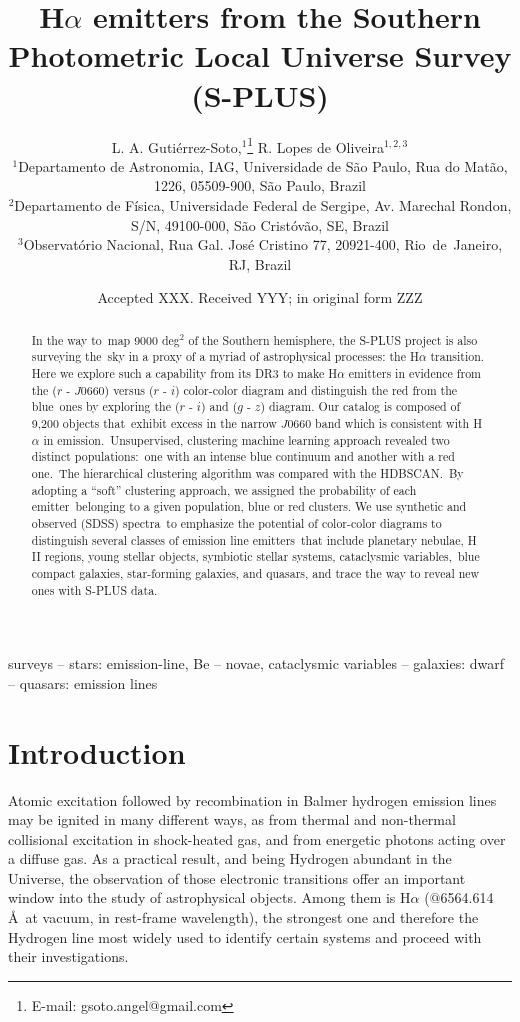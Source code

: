 \documentclass[fleqn,usenatbib]{mnras}
\title[S-PLUS: H$\alpha$ emitters]{H$\alpha$ emitters from the Southern Photometric Local Universe Survey (S-PLUS)}
\author[Guti\'{e}rrez-Soto et al.]{
L. A. Guti\'{e}rrez-Soto,$^{1}$\thanks{E-mail: gsoto.angel@gmail.com}
R. Lopes de Oliveira$^{1,2,3}$
\\
$^{1}$Departamento de Astronomia, IAG, Universidade de S\~{a}o Paulo, Rua do Mat\~{a}o,
1226, 05509-900, S\~{a}o Paulo, Brazil\\
$^{2}$Departamento de F\'isica, Universidade Federal de Sergipe, Av. Marechal Rondon, S/N, 49100-000, S\~ao Crist\'ov\~ao, SE, Brazil\\
$^{3}$Observat\'orio Nacional, Rua Gal. Jos\'e Cristino 77, 20921-400, Rio~de~Janeiro, RJ, Brazil\\
}
\date{Accepted XXX. Received YYY; in original form ZZZ}
\begin{document}
\label{firstpage}
\pagerange{\pageref{firstpage}--\pageref{lastpage}}
\maketitle

\begin{abstract}

In the way to map 9000 deg$^2$ of the Southern hemisphere, the S-PLUS project is also surveying the sky in a proxy of a myriad of astrophysical processes: the H$\alpha$ transition. Here we explore such a capability from its DR3 to make H$\alpha$ emitters in evidence from 
the ($r$ - $J$0660) versus ($r$ - $i$) color-color diagram and distinguish the red from the blue ones by exploring the ($r$ - $i$) and ($g$ - $z$) diagram. Our catalog is composed of 9,200 objects that exhibit excess in the narrow $J$0660 band which is consistent with H{$\alpha$} in emission. Unsupervised, clustering machine learning approach revealed two distinct populations: one with an intense blue continuum and another with a red one. The hierarchical clustering algorithm was compared with the HDBSCAN. By adopting a ``soft'' clustering approach, we assigned the probability of each emitter belonging to a given population, blue or red clusters. We use synthetic and observed (SDSS) spectra to emphasize the potential of color-color diagrams to distinguish several classes of emission line emitters that include planetary nebulae, H II regions, young stellar objects, symbiotic stellar systems, cataclysmic variables, blue compact galaxies, star-forming galaxies, and quasars, and trace the way to reveal new ones with S-PLUS data.

\end{abstract}
\begin{keywords}
  surveys -- stars: emission-line, Be -- novae, cataclysmic variables
  -- galaxies: dwarf -- quasars: emission lines
\end{keywords}



\section{Introduction}

Atomic excitation followed by  recombination in Balmer hydrogen emission lines may be ignited in many different ways, as from thermal and non-thermal collisional excitation in shock-heated gas, and from energetic photons acting over a diffuse gas. As a practical result, and being Hydrogen abundant in the Universe, the observation of those electronic transitions offer an important window into the study of astrophysical objects.
Among them is H$\alpha$ ($@$6564.614\,\AA\
at vacuum, in rest-frame wavelength), 
the strongest one and therefore the Hydrogen line most widely used to identify certain systems and proceed with their investigations.
\end{document}

